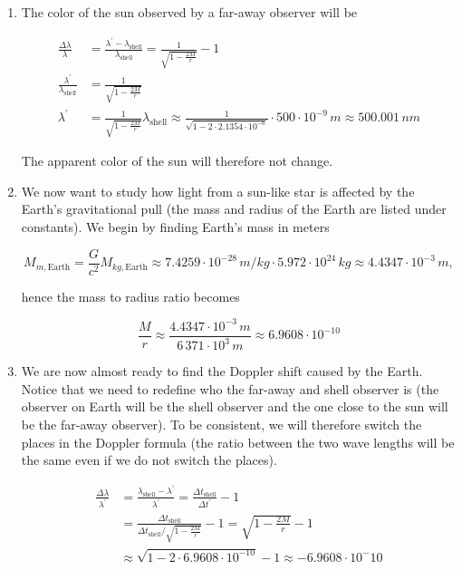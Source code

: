 \documentclass[a4paper,10pt,english]{article}
\begin{document}
\begin{enumerate}
\begin{enumerate}
\item The color of the sun observed by a far-away observer will be

\begin{align*}
\frac{\Delta \lambda}{\lambda}&=\frac{\lambda^{\prime}-\lambda_{\text{shell}}}{\lambda_{\text{shell}}}=\frac{1}{\sqrt{1-\frac{2M}{r}}}-1\\
\frac{\lambda^{\prime}}{\lambda_{\text{shell}}}&=\frac{1}{\sqrt{1-\frac{2M}{r}}}\\
\lambda^{\prime}&=\frac{1}{\sqrt{1-\frac{2M}{r}}}\lambda_{\text{shell}}\approx\frac{1}{\sqrt{1-2\cdot2.1354\cdot10^{-6}}}\cdot500\cdot10^{-9}\,m\approx500.001\,nm
\end{align*}

The apparent color of the sun will therefore not change.
  
\item We now want to study how light from a sun-like star is affected by the Earth's gravitational pull (the mass and radius of the Earth are listed under constants). We begin by finding Earth's mass in meters 

\[M_{m,\text{Earth}}=\frac{G}{c^{2}}M_{kg,\text{Earth}}\approx7.4259\cdot10^{-28}\,m/kg\cdot5.972\cdot10^{24}\,kg\approx4.4347\cdot10^{-3}\,m,\]

hence the mass to radius ratio becomes

\[\frac{M}{r}\approx\frac{4.4347\cdot10^{-3}\,m}{6\,371\cdot10^{3}\,m}\approx6.9608\cdot10^{-10}\]
  
\item We are now almost ready to find the Doppler shift caused by the Earth. Notice that we need to redefine who the far-away and shell observer is (the observer on Earth will be the shell observer and the one close to the sun will be the far-away observer). To be consistent, we will therefore switch the places in the Doppler formula (the ratio between the two wave lengths will be the same even if we do not switch the places).

\begin{align*}
\frac{\Delta \lambda}{\lambda^{\prime}}&=\frac{\lambda_{\text{shell}}-\lambda^{\prime}}{\lambda^{\prime}}=\frac{\Delta t_{\text{shell}}}{\Delta t^{\prime}}-1\\
&=\frac{\Delta t_{\text{shell}}}{\Delta t_{\text{shell}}/\sqrt{1-\frac{2M}{r}}}-1=\sqrt{1-\frac{2M}{r}}-1\\
&\approx\sqrt{1-2\cdot6.9608\cdot10^{-10}}-1\approx-6.9608\cdot10^-{10}
\end{align*}


\end{enumerate}
\end{enumerate}
\end{document}
